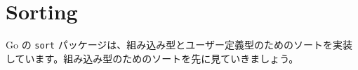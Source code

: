 \section{Sorting}

Go の \texttt{sort} パッケージは、組み込み型とユーザー定義型のためのソートを実装しています。組み込み型のためのソートを先に見ていきましょう。





